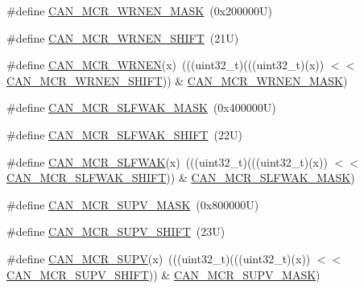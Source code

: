 \begin{DoxyCompactItemize}
\item 
\#define \mbox{\hyperlink{group___c_a_n___register___masks_ga235a7c2b04cfd0765fa2a9313fc1fcd1}{C\+A\+N\+\_\+\+M\+C\+R\+\_\+\+W\+R\+N\+E\+N\+\_\+\+M\+A\+SK}}~(0x200000\+U)
\item 
\#define \mbox{\hyperlink{group___c_a_n___register___masks_ga728f73a79721a9cc4b1b82ce6eaa74a7}{C\+A\+N\+\_\+\+M\+C\+R\+\_\+\+W\+R\+N\+E\+N\+\_\+\+S\+H\+I\+FT}}~(21\+U)
\item 
\#define \mbox{\hyperlink{group___c_a_n___register___masks_gab2d3edb6cf1aa5fd9ef050497726b871}{C\+A\+N\+\_\+\+M\+C\+R\+\_\+\+W\+R\+N\+EN}}(x)~(((uint32\+\_\+t)(((uint32\+\_\+t)(x)) $<$$<$ \mbox{\hyperlink{group___c_a_n___register___masks_ga728f73a79721a9cc4b1b82ce6eaa74a7}{C\+A\+N\+\_\+\+M\+C\+R\+\_\+\+W\+R\+N\+E\+N\+\_\+\+S\+H\+I\+FT}})) \& \mbox{\hyperlink{group___c_a_n___register___masks_ga235a7c2b04cfd0765fa2a9313fc1fcd1}{C\+A\+N\+\_\+\+M\+C\+R\+\_\+\+W\+R\+N\+E\+N\+\_\+\+M\+A\+SK}})
\item 
\#define \mbox{\hyperlink{group___c_a_n___register___masks_gacf4f1d3d5d5eccf0f03f5f5ed4dc1bba}{C\+A\+N\+\_\+\+M\+C\+R\+\_\+\+S\+L\+F\+W\+A\+K\+\_\+\+M\+A\+SK}}~(0x400000\+U)
\item 
\#define \mbox{\hyperlink{group___c_a_n___register___masks_ga8dc0878396e4d4e4b73deec9cf23b0b1}{C\+A\+N\+\_\+\+M\+C\+R\+\_\+\+S\+L\+F\+W\+A\+K\+\_\+\+S\+H\+I\+FT}}~(22\+U)
\item 
\#define \mbox{\hyperlink{group___c_a_n___register___masks_gae48a23dba7a475b24c88aeadfac63936}{C\+A\+N\+\_\+\+M\+C\+R\+\_\+\+S\+L\+F\+W\+AK}}(x)~(((uint32\+\_\+t)(((uint32\+\_\+t)(x)) $<$$<$ \mbox{\hyperlink{group___c_a_n___register___masks_ga8dc0878396e4d4e4b73deec9cf23b0b1}{C\+A\+N\+\_\+\+M\+C\+R\+\_\+\+S\+L\+F\+W\+A\+K\+\_\+\+S\+H\+I\+FT}})) \& \mbox{\hyperlink{group___c_a_n___register___masks_gacf4f1d3d5d5eccf0f03f5f5ed4dc1bba}{C\+A\+N\+\_\+\+M\+C\+R\+\_\+\+S\+L\+F\+W\+A\+K\+\_\+\+M\+A\+SK}})
\item 
\#define \mbox{\hyperlink{group___c_a_n___register___masks_ga00521c6adbee738b0f73380052600203}{C\+A\+N\+\_\+\+M\+C\+R\+\_\+\+S\+U\+P\+V\+\_\+\+M\+A\+SK}}~(0x800000\+U)
\item 
\#define \mbox{\hyperlink{group___c_a_n___register___masks_ga5a448e496f0243c035ddcb70b8a07c4e}{C\+A\+N\+\_\+\+M\+C\+R\+\_\+\+S\+U\+P\+V\+\_\+\+S\+H\+I\+FT}}~(23\+U)
\item 
\#define \mbox{\hyperlink{group___c_a_n___register___masks_ga286baa5198853ca7e0772f1a72a94d63}{C\+A\+N\+\_\+\+M\+C\+R\+\_\+\+S\+U\+PV}}(x)~(((uint32\+\_\+t)(((uint32\+\_\+t)(x)) $<$$<$ \mbox{\hyperlink{group___c_a_n___register___masks_ga5a448e496f0243c035ddcb70b8a07c4e}{C\+A\+N\+\_\+\+M\+C\+R\+\_\+\+S\+U\+P\+V\+\_\+\+S\+H\+I\+FT}})) \& \mbox{\hyperlink{group___c_a_n___register___masks_ga00521c6adbee738b0f73380052600203}{C\+A\+N\+\_\+\+M\+C\+R\+\_\+\+S\+U\+P\+V\+\_\+\+M\+A\+SK}})
$$
\end{DoxyCompactItemize}

